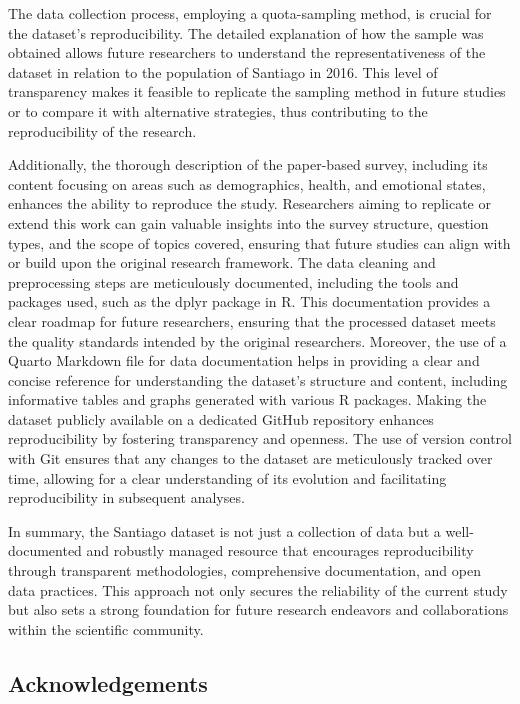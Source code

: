 \documentclass[
]{article}
\begin{document}
The data collection process, employing a quota-sampling method, is
crucial for the dataset's reproducibility. The detailed explanation of
how the sample was obtained allows future researchers to understand the
representativeness of the dataset in relation to the population of
Santiago in 2016. This level of transparency makes it feasible to
replicate the sampling method in future studies or to compare it with
alternative strategies, thus contributing to the reproducibility of the
research.

Additionally, the thorough description of the paper-based survey,
including its content focusing on areas such as demographics, health,
and emotional states, enhances the ability to reproduce the study.
Researchers aiming to replicate or extend this work can gain valuable
insights into the survey structure, question types, and the scope of
topics covered, ensuring that future studies can align with or build
upon the original research framework. The data cleaning and
preprocessing steps are meticulously documented, including the tools and
packages used, such as the dplyr package in R. This documentation
provides a clear roadmap for future researchers, ensuring that the
processed dataset meets the quality standards intended by the original
researchers. Moreover, the use of a Quarto Markdown file for data
documentation helps in providing a clear and concise reference for
understanding the dataset's structure and content, including informative
tables and graphs generated with various R packages. Making the dataset
publicly available on a dedicated GitHub repository enhances
reproducibility by fostering transparency and openness. The use of
version control with Git ensures that any changes to the dataset are
meticulously tracked over time, allowing for a clear understanding of
its evolution and facilitating reproducibility in subsequent analyses.

In summary, the Santiago dataset is not just a collection of data but a
well-documented and robustly managed resource that encourages
reproducibility through transparent methodologies, comprehensive
documentation, and open data practices. This approach not only secures
the reliability of the current study but also sets a strong foundation
for future research endeavors and collaborations within the scientific
community.

\hypertarget{acknowledgements}{%
\subsection{Acknowledgements}\label{acknowledgements}}
\end{document}
